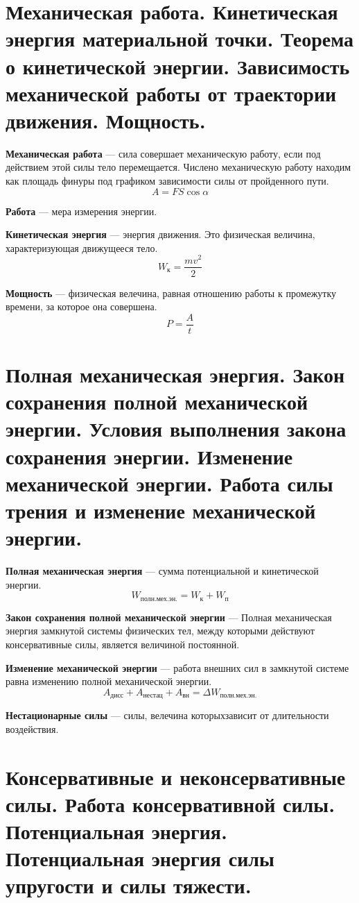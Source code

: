 \documentclass{report}
\begin{document}
\part{Механическая работа. 
Кинетическая энергия материальной точки. 
Теорема о кинетической энергии. 
Зависимость механической работы от траектории движения. 
Мощность.}

{\bf Механическая работа} ---
сила совершает механическую работу, если под действием этой силы тело перемещается.
Числено механическую работу находим как площадь финуры под графиком зависимости силы от 
пройденного пути.
$$
A=FS\cos{\alpha}
$$

{\bf Работа} ---
мера измерения энергии.

{\bf Кинетическая энергия} ---
энергия движения. Это физическая величина, характеризующая движущееся тело.
$$
W_\textrm{к}=\frac{mv^2}{2}
$$

{\bf Мощность} ---
физическая велечина, равная отношению работы к промежутку времени, за которое она совершена.
$$
P=\frac{A}{t}
$$



\part{Полная механическая энергия. 
Закон сохранения полной механической энергии. 
Условия выполнения закона сохранения энергии. 
Изменение механической энергии. 
Работа силы трения и изменение механической энергии.}

{\bf Полная механическая энергия} ---
сумма потенциальной и кинетической энергии.
$$
W_\textrm{полн.мех.эн.}=W_\textrm{к}+W_\textrm{п}
$$

{\bf Закон сохранения полной механической энергии} ---
Полная механическая энергия замкнутой системы физических тел, 
между которыми действуют консервативные силы, является величиной постоянной.

{\bf Изменение механической энергии} ---
работа внешних сил в замкнутой системе равна изменению полной механической энергии.
$$
A_\textrm{дисс}+A_\textrm{нестац}+A_\textrm{вн}=\Delta W_\textrm{полн.мех.эн.}
$$

{\bf Нестационарные силы} ---
силы, велечина которыхзависит от длительности воздействия.

\part{Консервативные и неконсервативные силы. 
Работа консервативной силы. 
Потенциальная энергия. 
Потенциальная энергия силы упругости и силы тяжести.}
\end{document}
